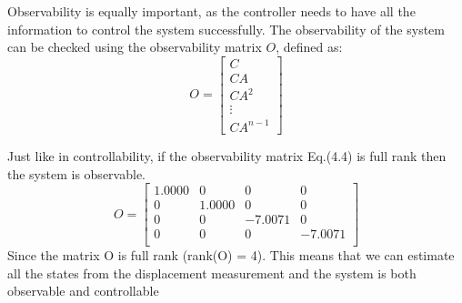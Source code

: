 Observability is equally important, as the controller needs to have all the information to control the system successfully. The observability of the system can be checked using the observability matrix $O$, defined as:
\begin{equation}
   O = 
\begin{bmatrix}
    C \\
    CA \\
    CA^2 \\
    \vdots \\
    CA^{n-1}
\end{bmatrix}
\end{equation}

Just like in controllability, if the observability matrix Eq.(4.4) is full rank then the system is observable.
\begin{equation}
   O = 
\begin{bmatrix}
    1.0000 & 0 & 0 & 0 \\
    0 & 1.0000 & 0 & 0 \\
    0 & 0 & -7.0071 & 0 \\
    0 & 0 & 0 & -7.0071 \\
\end{bmatrix}
\end{equation}
Since the matrix O is full rank (rank(O) = 4). This
means that we can estimate all the states from the displacement measurement and the system is both observable and controllable

